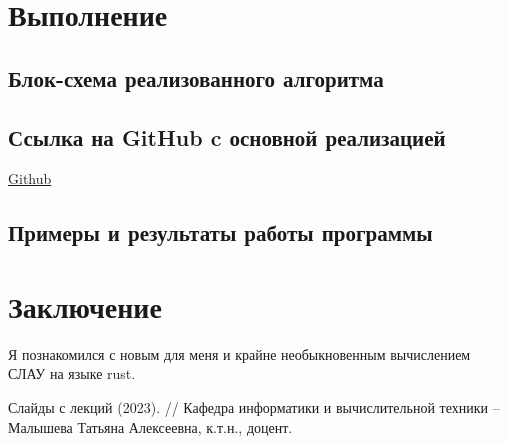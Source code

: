 \documentclass{article}
\begin{document}
\section{Выполнение}

\subsection{Блок-схема реализованного алгоритма}
\subsection{Ссылка на GitHub c основной реализацией}
      \href{https://github.com/isofinly/compmath}{Github}

\subsection{Примеры и результаты работы программы}
      \begin{center}

      \end{center}
      

\section{Заключение}
Я познакомился с новым для меня и крайне необыкновенным вычислением СЛАУ на языке rust.


\begin{thebibliography}{9}
    Слайды с лекций (2023). // Кафедра информатики и вычислительной техники -- Малышева Татьяна Алексеевна, к.т.н., доцент.
\end{thebibliography} 
\end{document}
